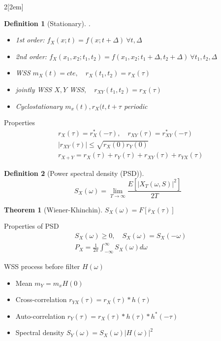 \documentclass[leqno]{article}
\newtheorem*{definition}{Definition}
\newtheorem*{theorem}{Theorem}
\begin{document}
\begin{multicols}{2}[\columnsep2em]
\begin{definition}[Stationary] .
  \begin{itemize}[topsep=-6pt, itemsep=0pt]
    \item 1st order:  $f_X(x;t)=f(x; t+\Delta ) \ \forall t, \Delta $
    \item 2nd order:  $f_X(x_1, x_2;t_1,t_2)=f(x_1,x_2; t_1+\Delta, t_2+\Delta ) \ \forall t_1, t_2, \Delta $
	\item WSS  $m_X(t) = cte, \quad r_X(t_1, t_2) = r_X(\tau )$
	\item jointly WSS  $X, Y $ WSS$, \quad r_{XY}(t_1, t_2) = r_X(\tau )$
	\item Cyclostationary $m_x(t), r_X(t, t+\tau $ periodic
  \end{itemize}
\end{definition}

Properties
\begin{align*}
& r_{X}(\tau ) = r^*_{X}(-\tau ), \quad r_{XY}(\tau ) = r^*_{XY}(-\tau )\\
& |r_{XY}(\tau )| \le \sqrt{r_X(0)r_Y(0)}\\
& r_{X+Y} = r_X(\tau ) + r_Y(\tau ) + r_{XY}(\tau ) + r_{YX}(\tau )
\end{align*}

\begin{definition}[Power spectral density (PSD)]
\[
S_X(\omega ) = \lim_{T\to  \infty} \frac{E[|X_T(\omega , S)|^2]}{2T}
\]
\end{definition}

\begin{theorem}[Wiener-Khinchin]
  $S_X(\omega )=F[\overline{r}_X(\tau )]$
\end{theorem}

Properties of PSD
\begin{align*}
  & S_X(\omega ) \ge 0, \quad S_X(\omega ) = S_X(-\omega ) \\
  & P_X = \frac{1}{2\pi} \int_{-\infty}^{\infty} S_X(\omega ) d\omega 
\end{align*}

WSS process before filter $H(\omega )$
\begin{itemize}[topsep=-6pt, itemsep=0pt]
  \item Mean $m_Y = m_xH(0)$
  \item  Cross-correlation  $r_{YX}(\tau ) = r_X(\tau )\ast h(\tau )$ 
  \item Auto-correlation $r_Y(\tau )=r_X(\tau )\ast h(\tau )\ast h^*(-\tau )$
  \item Spectral density $S_Y(\omega ) = S_X(\omega )|H(\omega )|^2$
\end{itemize}


\end{multicols}
\end{document}
